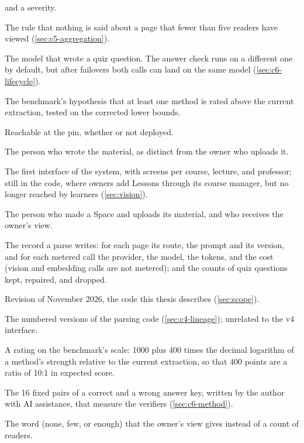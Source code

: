 \begin{description}
    and a severity.
  \item[floor] The rule that nothing is said about a page that fewer than
    five readers have viewed (\cref{sec:c5-aggregation}).
  \item[generating model] The model that wrote a quiz question. The answer
    check runs on a different one by default, but after failovers both
    calls can land on the same model (\cref{sec:c6-lifecycle}).
  \item[H1] The benchmark's hypothesis that at least one method is rated
    above the current extraction, tested on the corrected lower bounds.
  \item[in the code] Reachable at the pin, whether or not deployed.
  \item[lecturer] The person who wrote the material, as distinct from the
    owner who uploads it.
  \item[older interface] The first interface of the system, with screens per
    course, lecture, and professor; still in the code, where owners add
    Lessons through its course manager, but no longer reached by learners
    (\cref{sec:vision}).
  \item[owner] The person who made a Space and uploads its material, and who
    receives the owner's view.
  \item[parse receipt] The record a parse writes: for each page its route,
    the prompt and its version, and for each metered call the provider, the
    model, the tokens, and the cost (vision and embedding calls are not
    metered); and the counts of quiz questions kept, repaired, and dropped.
  \item[pin, the] Revision \code{\thesisCommit} of November 2026, the code
    this thesis describes (\cref{sec:scope}).
  \item[pipeline v1 to v5] The numbered versions of the parsing code
    (\cref{sec:c4-lineage}); unrelated to the v4 interface.
  \item[points] A rating on the benchmark's scale: 1000 plus 400 times the
    decimal logarithm of a method's strength relative to the current
    extraction, so that 400 points are a ratio of 10:1 in expected score.
  \item[probe] The 16 fixed pairs of a correct and a wrong answer key,
    written by the author with AI assistance, that measure the verifiers
    (\cref{sec:c6-method}).
  \item[reach] The word (none, few, or enough) that the owner's view gives
    instead of a count of readers.

\end{description}
